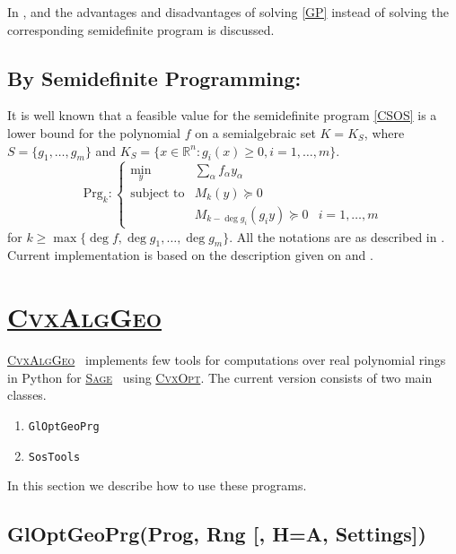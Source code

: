 \documentclass{amsart}
\theoremstyle{definition}
\newcommand{\reals}{\mathbb{R}}
\newcommand{\sage}{\href{http://www.sagemath.org}{\textsc{Sage}}}
\newcommand{\cvxalggeo}{\href{https://docs.google.com/open?id=0B16xZ-lflLrZZGMwN2I1MGItNzk5Mi00OGIxLTljZjgtYTgxMmUyMTZiZGU4}{\textsc{CvxAlgGeo}}}
\begin{document}
In \cite{lbgpLasserre}, \cite{lbgp} and \cite{genlbgp} the advantages and disadvantages of solving \eqref{GP} instead of solving the corresponding 
semidefinite program is discussed.

\subsection{By Semidefinite Programming:}
It is  well known that a feasible value for the semidefinite program \eqref{CSOS} is a lower bound for the polynomial $f$ on a semialgebraic set $K=K_S$, where 
$S=\{g_1,\dots,g_m\}$ and $K_S=\{x\in\reals^n:g_i(x)\ge0, i=1,\dots,m\}$.
\begin{equation}\label{CSOS}
\textrm{Prg}_k:\left\lbrace\begin{array}{lll}
	\min\limits_y & \sum_{\alpha}f_{\alpha}y_{\alpha} & \\
	\textrm{subject to} & M_k(y)\succeq0 & \\
	 & M_{k-\deg g_i}(g_iy)\succeq0 & i=1,\dots,m
\end{array}\right.
\end{equation}
for $k\ge\max\{\deg f,\deg g_1,\dots,\deg g_m\}$. All the notations are as described in \cite{LasserreSDP}. Current implementation is based on the description 
given on \cite[Chapter 4 and 5]{LasserreMPP} and \cite{Laurent}.
\section{\cvxalggeo}

\cvxalggeo~ implements few tools for computations over real polynomial rings in Python for \sage~ using 
\href{http://abel.ee.ucla.edu/cvxopt/}{\textsc{CvxOpt}}.
The current version consists of two main classes.
\begin{enumerate}
	\item{\texttt{GlOptGeoPrg}}
	\item{\texttt{SosTools}}
\end{enumerate}
In this section we describe how to use these programs.
	
\subsection{GlOptGeoPrg(Prog, Rng [, H=A, Settings])}~
\end{document}
